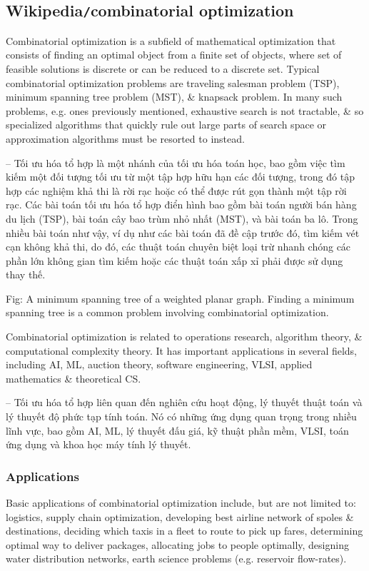 \documentclass{article}
\begin{document}

\subsection{Wikipedia{\tt/}combinatorial optimization}
Combinatorial optimization is a subfield of mathematical optimization that consists of finding an optimal object from a finite set of objects, where set of feasible solutions is discrete or can be reduced to a discrete set. Typical combinatorial optimization problems are traveling salesman problem (TSP), minimum spanning tree problem (MST), \& knapsack problem. In many such problems, e.g. ones previously mentioned, exhaustive search is not tractable, \& so specialized algorithms that quickly rule out large parts of search space or approximation algorithms must be resorted to instead.

-- Tối ưu hóa tổ hợp là một nhánh của tối ưu hóa toán học, bao gồm việc tìm kiếm một đối tượng tối ưu từ một tập hợp hữu hạn các đối tượng, trong đó tập hợp các nghiệm khả thi là rời rạc hoặc có thể được rút gọn thành một tập rời rạc. Các bài toán tối ưu hóa tổ hợp điển hình bao gồm bài toán người bán hàng du lịch (TSP), bài toán cây bao trùm nhỏ nhất (MST), và bài toán ba lô. Trong nhiều bài toán như vậy, ví dụ như các bài toán đã đề cập trước đó, tìm kiếm vét cạn không khả thi, do đó, các thuật toán chuyên biệt loại trừ nhanh chóng các phần lớn không gian tìm kiếm hoặc các thuật toán xấp xỉ phải được sử dụng thay thế.

{\sf Fig: A minimum spanning tree of a weighted planar graph. Finding a minimum spanning tree is a common problem involving combinatorial optimization.}

Combinatorial optimization is related to operations research, algorithm theory, \& computational complexity theory. It has important applications in several fields, including AI, ML, auction theory, software engineering, VLSI, applied mathematics \& theoretical CS.

-- Tối ưu hóa tổ hợp liên quan đến nghiên cứu hoạt động, lý thuyết thuật toán và lý thuyết độ phức tạp tính toán. Nó có những ứng dụng quan trọng trong nhiều lĩnh vực, bao gồm AI, ML, lý thuyết đấu giá, kỹ thuật phần mềm, VLSI, toán ứng dụng và khoa học máy tính lý thuyết.


\subsubsection{Applications}
Basic applications of combinatorial optimization include, but are not limited to: logistics, supply chain optimization, developing best airline network of spoles \& destinations, deciding which taxis in a fleet to route to pick up fares, determining optimal way to deliver packages, allocating jobs to people optimally, designing water distribution networks, earth science problems (e.g. reservoir flow-rates).
\end{document}
